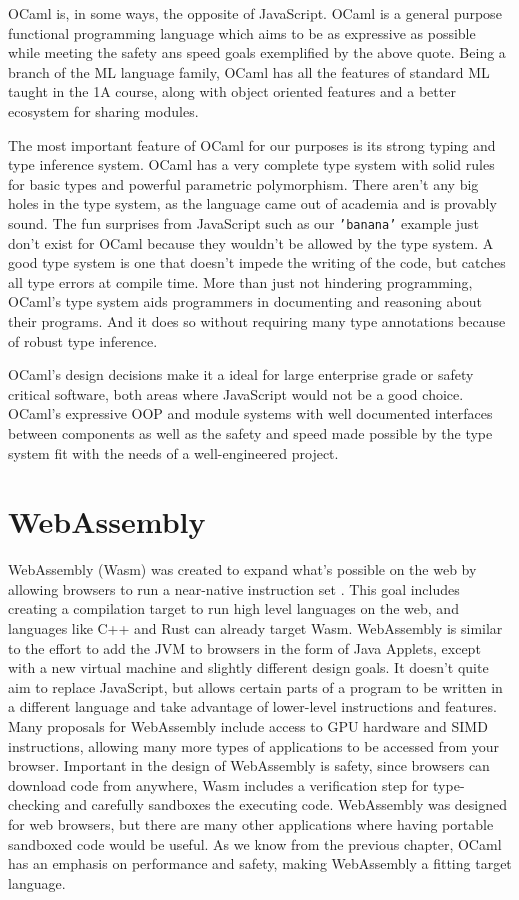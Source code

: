 \documentclass[12pt,a4paper,twoside,openright]{report}
\begin{document}
OCaml is, in some ways, the opposite of JavaScript.
OCaml is a general purpose functional programming language which aims to be as expressive as possible while meeting the safety ans speed goals exemplified by the above quote.
Being a branch of the ML language family, OCaml has all the features of standard ML taught in the 1A course, along with object oriented features and a better ecosystem for sharing modules.

The most important feature of OCaml for our purposes is its strong typing and type inference system.
OCaml has a very complete type system with solid rules for basic types and powerful parametric polymorphism.
There aren't any big holes in the type system, as the language came out of academia and is provably sound.
The fun surprises from JavaScript such as our {\tt 'banana'} example just don't exist for OCaml because they wouldn't be allowed by the type system.
A good type system is one that doesn't impede the writing of the code, but catches all type errors at compile time.
More than just not hindering programming, OCaml's type system aids programmers in documenting and reasoning about their programs.
And it does so without requiring many type annotations because of robust type inference.

OCaml's design decisions make it a ideal for large enterprise grade or safety critical software, both areas where JavaScript would not be a good choice.
OCaml's expressive OOP and module systems with well documented interfaces between components as well as the safety and speed made possible by the type system fit with the needs of a well-engineered project.

\section{WebAssembly}

WebAssembly (Wasm) was created to expand what's possible on the web by allowing browsers to run a near-native instruction set \cite{wasmorg}.
This goal includes creating a compilation target to run high level languages on the web, and languages like C++ and Rust can already target Wasm.
WebAssembly is similar to the effort to add the JVM to browsers in the form of Java Applets, except with a new virtual machine and slightly different design goals.
It doesn't quite aim to replace JavaScript, but allows certain parts of a program to be written in a different language and take advantage of lower-level instructions and features.
Many proposals for WebAssembly include access to GPU hardware and SIMD instructions, allowing many more types of applications to be accessed from your browser.
Important in the design of WebAssembly is safety, since browsers can download code from anywhere, Wasm includes a verification step for type-checking and carefully sandboxes the executing code.
WebAssembly was designed for web browsers, but there are many other applications where having portable sandboxed code would be useful.
As we know from the previous chapter, OCaml has an emphasis on performance and safety, making WebAssembly a fitting target language.
\end{document}
